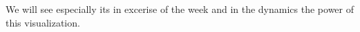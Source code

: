 We will see especially its in excerise of the week and in the dynamics the power of this visualization.